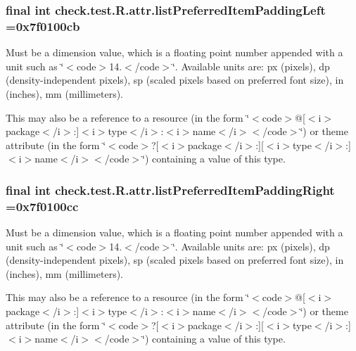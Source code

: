 \subsubsection[{list\+Preferred\+Item\+Padding\+Left}]{\setlength{\rightskip}{0pt plus 5cm}final int check.\+test.\+R.\+attr.\+list\+Preferred\+Item\+Padding\+Left =0x7f0100cb\hspace{0.3cm}{\ttfamily [static]}}\label{classcheck_1_1test_1_1_r_1_1attr_a5c876f039bc3f86b36be1456b3b363ae}
Must be a dimension value, which is a floating point number appended with a unit such as \char`\"{}$<$code$>$14.\+5sp$<$/code$>$\char`\"{}. Available units are\+: px (pixels), dp (density-\/independent pixels), sp (scaled pixels based on preferred font size), in (inches), mm (millimeters). 

This may also be a reference to a resource (in the form \char`\"{}$<$code$>$@\mbox{[}$<$i$>$package$<$/i$>$\+:\mbox{]}$<$i$>$type$<$/i$>$\+:$<$i$>$name$<$/i$>$$<$/code$>$\char`\"{}) or theme attribute (in the form \char`\"{}$<$code$>$?\mbox{[}$<$i$>$package$<$/i$>$\+:\mbox{]}\mbox{[}$<$i$>$type$<$/i$>$\+:\mbox{]}$<$i$>$name$<$/i$>$$<$/code$>$\char`\"{}) containing a value of this type. \hypertarget{classcheck_1_1test_1_1_r_1_1attr_a6d029d520bbcf01ad4cbef4eb98f7e94}{}
\subsubsection[{list\+Preferred\+Item\+Padding\+Right}]{\setlength{\rightskip}{0pt plus 5cm}final int check.\+test.\+R.\+attr.\+list\+Preferred\+Item\+Padding\+Right =0x7f0100cc\hspace{0.3cm}{\ttfamily [static]}}\label{classcheck_1_1test_1_1_r_1_1attr_a6d029d520bbcf01ad4cbef4eb98f7e94}
Must be a dimension value, which is a floating point number appended with a unit such as \char`\"{}$<$code$>$14.\+5sp$<$/code$>$\char`\"{}. Available units are\+: px (pixels), dp (density-\/independent pixels), sp (scaled pixels based on preferred font size), in (inches), mm (millimeters). 

This may also be a reference to a resource (in the form \char`\"{}$<$code$>$@\mbox{[}$<$i$>$package$<$/i$>$\+:\mbox{]}$<$i$>$type$<$/i$>$\+:$<$i$>$name$<$/i$>$$<$/code$>$\char`\"{}) or theme attribute (in the form \char`\"{}$<$code$>$?\mbox{[}$<$i$>$package$<$/i$>$\+:\mbox{]}\mbox{[}$<$i$>$type$<$/i$>$\+:\mbox{]}$<$i$>$name$<$/i$>$$<$/code$>$\char`\"{}) containing a value of this type. \hypertarget{classcheck_1_1test_1_1_r_1_1attr_a88dc33a575e7d1ce7a25603825bb87c0}{}
